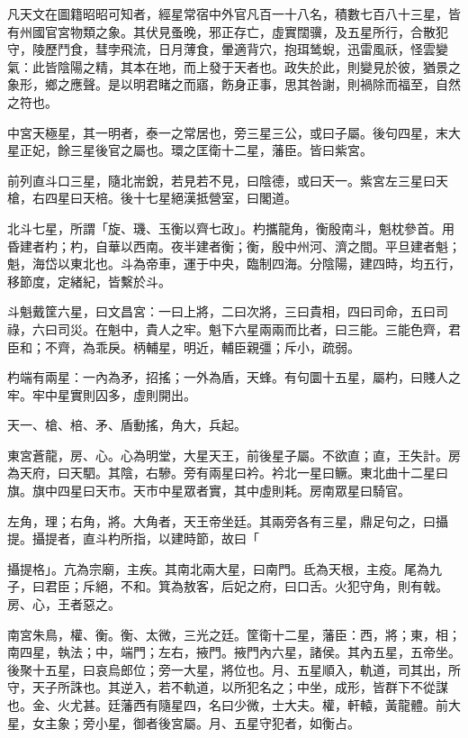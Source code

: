 
\begin{pinyinscope}
凡天文在圖籍昭昭可知者，經星常宿中外官凡百一十八名，積數七百八十三星，皆有州國官宮物類之象。其伏見蚤晚，邪正存亡，虛實闊骥，及五星所行，合散犯守，陵歷鬥食，彗孛飛流，日月薄食，暈適背穴，抱珥鸶蜺，迅雷風祅，怪雲變氣：此皆陰陽之精，其本在地，而上發于天者也。政失於此，則變見於彼，猶景之象形，鄉之應聲。是以明君睹之而寤，飭身正事，思其咎謝，則禍除而福至，自然之符也。

中宮天極星，其一明者，泰一之常居也，旁三星三公，或曰子屬。後句四星，末大星正妃，餘三星後官之屬也。環之匡衛十二星，藩臣。皆曰紫宮。

前列直斗口三星，隨北耑銳，若見若不見，曰陰德，或曰天一。紫宮左三星曰天槍，右四星曰天棓。後十七星絕漢抵營室，曰閣道。

北斗七星，所謂「旋、璣、玉衡以齊七政」。杓攜龍角，衡殷南斗，魁枕參首。用昏建者杓；杓，自華以西南。夜半建者衡；衡，殷中州河、濟之間。平旦建者魁；魁，海岱以東北也。斗為帝車，運于中央，臨制四海。分陰陽，建四時，均五行，移節度，定緒紀，皆繫於斗。

斗魁戴筐六星，曰文昌宮：一曰上將，二曰次將，三曰貴相，四曰司命，五曰司祿，六曰司災。在魁中，貴人之牢。魁下六星兩兩而比者，曰三能。三能色齊，君臣和；不齊，為乖戾。柄輔星，明近，輔臣親彊；斥小，疏弱。

杓端有兩星：一內為矛，招搖；一外為盾，天蜂。有句圜十五星，屬杓，曰賤人之牢。牢中星實則囚多，虛則開出。

天一、槍、棓、矛、盾動搖，角大，兵起。

東宮蒼龍，房、心。心為明堂，大星天王，前後星子屬。不欲直；直，王失計。房為天府，曰天駟。其陰，右驂。旁有兩星曰衿。衿北一星曰鳜。東北曲十二星曰旗。旗中四星曰天市。天市中星眾者實，其中虛則耗。房南眾星曰騎官。

左角，理；右角，將。大角者，天王帝坐廷。其兩旁各有三星，鼎足句之，曰攝提。攝提者，直斗杓所指，以建時節，故曰「

攝提格」。亢為宗廟，主疾。其南北兩大星，曰南門。氐為天根，主疫。尾為九子，曰君臣；斥絕，不和。箕為敖客，后妃之府，曰口舌。火犯守角，則有戟。房、心，王者惡之。

南宮朱鳥，權、衡。衡、太微，三光之廷。筐衛十二星，藩臣：西，將；東，相；南四星，執法；中，端門；左右，掖門。掖門內六星，諸侯。其內五星，五帝坐。後聚十五星，曰哀烏郎位；旁一大星，將位也。月、五星順入，軌道，司其出，所守，天子所誅也。其逆入，若不軌道，以所犯名之；中坐，成形，皆群下不從謀也。金、火尤甚。廷藩西有隨星四，名曰少微，士大夫。權，軒轅，黃龍體。前大星，女主象；旁小星，御者後宮屬。月、五星守犯者，如衡占。


\end{pinyinscope}
